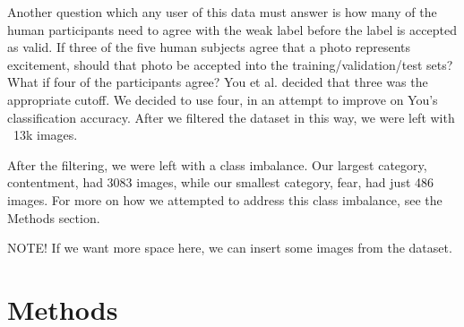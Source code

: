 \documentclass[10pt,twocolumn,letterpaper]{article}
\begin{document}
Another question which any user of this data must answer is how many of the human participants need to agree with the weak label before the label is accepted as valid. If three of the five human subjects agree that a photo represents excitement, should that photo be accepted into the training/validation/test sets? What if four of the participants agree? You et al. decided that three was the appropriate cutoff. We decided to use four, in an attempt to improve on You's classification accuracy. After we filtered the dataset in this way, we were left with ~13k images.

After the filtering, we were left with a class imbalance. Our largest category, contentment, had 3083 images, while our smallest category, fear, had just 486 images. For more on how we attempted to address this class imbalance, see the Methods section.

NOTE! If we want more space here, we can insert some images from the dataset.

\section{Methods}

{\small


}
\end{document}
